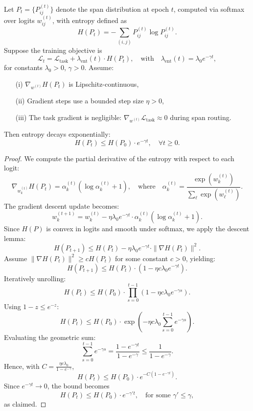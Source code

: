 \begin{proposition}
\label{prop:entropy_decay}
Let \( P_t = \{P_{ij}^{(t)}\} \) denote the span distribution at epoch \(t\), computed via softmax over logits \(w_{ij}^{(t)}\), with entropy defined as
\[
H(P_t) = -\sum_{(i,j)} P_{ij}^{(t)} \log P_{ij}^{(t)}.
\]
Suppose the training objective is
\[
\mathcal{L}_t = \mathcal{L}_{\text{task}} + \lambda_{\mathrm{ent}}(t) \cdot H(P_t), \quad \text{with} \quad \lambda_{\mathrm{ent}}(t) = \lambda_0 e^{-\gamma t},
\]
for constants \(\lambda_0 > 0\), \(\gamma > 0\). Assume:
\begin{itemize}
    \item[(i)] \(\nabla_{w^{(t)}} H(P_t)\) is Lipschitz-continuous,
    \item[(ii)] Gradient steps use a bounded step size \(\eta > 0\),
    \item[(iii)] The task gradient is negligible: \(\nabla_{w^{(t)}} \mathcal{L}_{\text{task}} \approx 0\) during span routing.
\end{itemize}
Then entropy decays exponentially:
\[
H(P_t) \leq H(P_0) \cdot e^{-\gamma t}, \quad \forall t \geq 0.
\]
\end{proposition}

\begin{proof}
We compute the partial derivative of the entropy with respect to each logit:
\[
\nabla_{w_k^{(t)}} H(P_t) = \alpha_k^{(t)} \left( \log \alpha_k^{(t)} + 1 \right), \quad \text{where} \quad \alpha_k^{(t)} = \frac{\exp(w_k^{(t)})}{\sum_\ell \exp(w_\ell^{(t)})}.
\]
The gradient descent update becomes:
\[
w_k^{(t+1)} = w_k^{(t)} - \eta \lambda_0 e^{-\gamma t} \cdot \alpha_k^{(t)} (\log \alpha_k^{(t)} + 1).
\]
Since \(H(P)\) is convex in logits and smooth under softmax, we apply the descent lemma:
\[
H(P_{t+1}) \leq H(P_t) - \eta \lambda_0 e^{-\gamma t} \cdot \| \nabla H(P_t) \|^2.
\]
Assume \(\| \nabla H(P_t) \|^2 \geq c H(P_t)\) for some constant \(c > 0\), yielding:
\[
H(P_{t+1}) \leq H(P_t) \cdot (1 - \eta c \lambda_0 e^{-\gamma t}).
\]
Iteratively unrolling:
\[
H(P_t) \leq H(P_0) \cdot \prod_{s=0}^{t-1} (1 - \eta c \lambda_0 e^{-\gamma s}).
\]
Using \(1 - z \leq e^{-z}\):
\[
H(P_t) \leq H(P_0) \cdot \exp\left(-\eta c \lambda_0 \sum_{s=0}^{t-1} e^{-\gamma s} \right).
\]
Evaluating the geometric sum:
\[
\sum_{s=0}^{t-1} e^{-\gamma s} = \frac{1 - e^{-\gamma t}}{1 - e^{-\gamma}} \leq \frac{1}{1 - e^{-\gamma}}.
\]
Hence, with \(C = \frac{\eta c \lambda_0}{1 - e^{-\gamma}}\),
\[
H(P_t) \leq H(P_0) \cdot e^{-C (1 - e^{-\gamma t})}.
\]
Since \(e^{-\gamma t} \to 0\), the bound becomes
\[
H(P_t) \leq H(P_0) \cdot e^{-\gamma' t}, \quad \text{for some } \gamma' \leq \gamma,
\]
as claimed.
\end{proof}









